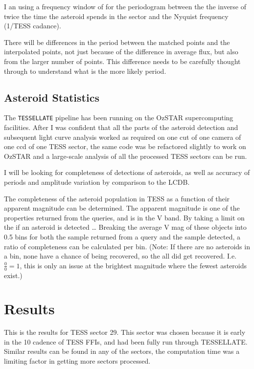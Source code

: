 \documentclass{UCreport}
\begin{document}
I an using a frequency window of for the periodogram between the the inverse of twice the time the asteroid spends in the sector and the Nyquist frequency (1/TESS cadance).

There will be differences in the period between the matched points and the interpolated points, not just because of the difference in average flux, but also from the larger number of points. This difference needs to be carefully thought through to understand what is the more likely period.


\subsection{Asteroid Statistics}\label{SubSec:StatMeth}

The \texttt{TESSELLATE} pipeline has been running on the OzSTAR supercomputing facilities.
After I was confident that all the parts of the asteroid detection and subsequent light curve analysis worked as required on one cut of one camera of one ccd of one TESS sector, the same code was be refactored slightly to work on OzSTAR and a large-scale analysis of all the processed TESS sectors can be run.

I will be looking for completeness of detections of asteroids, as well as accuracy of periods and amplitude variation by comparison to the LCDB.

The completeness of the asteroid population in TESS as a function of their apparent magnitude can be determined.
The apparent magnitude is one of the properties returned from the queries, and is in the V band.
By taking a limit on the if an asteroid is detected \dots %
Breaking the average V mag of these objects into \qty{0.5}{\mag} bins for both the sample returned from a query and the sample detected, a ratio of completeness can be calculated per bin.
(Note: If there are no asteroids in a bin, none have a chance of being recovered, so the all did get recovered. I.e. $\frac{0}{0}=1$, this is only an issue at the brightest magnitude where the fewest asteroids exist.)

\section{Results}\label{Sec:Res}

This is the results for TESS sector 29.
This sector was chosen because it is early in the \qty{10}{\min} cadence of TESS FFIs, and had been fully run through TESSELLATE.
Similar results can be found in any of the sectors, the computation time was a limiting factor in getting more sectors processed.
\end{document}
